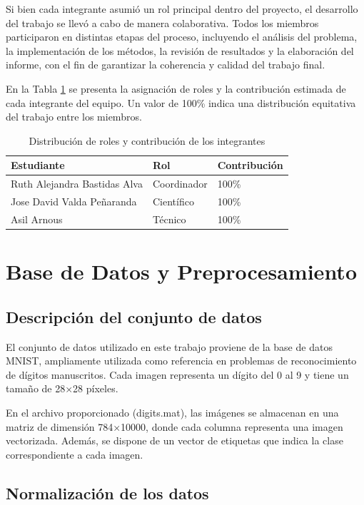 \documentclass[11pt, a4paper]{article}
\begin{document}
Si bien cada integrante asumió un rol principal dentro del proyecto, el desarrollo del trabajo se llevó a cabo de manera colaborativa. Todos los miembros participaron en distintas etapas del proceso, incluyendo el análisis del problema, la implementación de los métodos, la revisión de resultados y la elaboración del informe, con el fin de garantizar la coherencia y calidad del trabajo final.

En la Tabla \ref{tab:roles} se presenta la asignación de roles y la contribución estimada de cada integrante del equipo. Un valor de 100\% indica una distribución equitativa del trabajo entre los miembros.

\begin{table}[H]
\centering
\caption{Distribución de roles y contribución de los integrantes}
\label{tab:roles}
\begin{tabular}{lll}
\toprule
Estudiante & Rol & Contribución \\
\midrule
Ruth Alejandra Bastidas Alva & Coordinador & 100\% \\
Jose David Valda Peñaranda & Científico & 100\% \\
Asil Arnous & Técnico & 100\% \\
\bottomrule
\end{tabular}
\end{table}

\section{Base de Datos y Preprocesamiento}

\subsection{Descripción del conjunto de datos}


El conjunto de datos utilizado en este trabajo proviene de la base de datos MNIST, ampliamente utilizada como referencia en problemas de reconocimiento de dígitos manuscritos. Cada imagen representa un dígito del 0 al 9 y tiene un tamaño de 28×28 píxeles.

En el archivo proporcionado (digits.mat), las imágenes se almacenan en una matriz de dimensión 784×10000, donde cada columna representa una imagen vectorizada. Además, se dispone de un vector de etiquetas que indica la clase correspondiente a cada imagen.


\subsection{Normalización de los datos}
\end{document}
